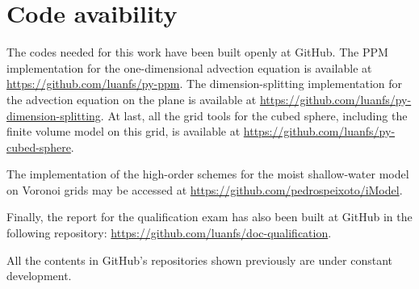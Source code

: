 \chapter{Code avaibility}
\label{anexo-code}

The codes needed for this work have been built openly at GitHub. 
The PPM implementation for the one-dimensional advection equation is available 
at \url{https://github.com/luanfs/py-ppm}.
The dimension-splitting implementation for the advection equation on the plane 
is available at \url{https://github.com/luanfs/py-dimension-splitting}.
At last, all the grid tools for the cubed sphere, including the finite volume
model on this grid, is available at \url{https://github.com/luanfs/py-cubed-sphere}.

The implementation of the high-order schemes for the moist shallow-water model
on Voronoi grids may be accessed at
\url{https://github.com/pedrospeixoto/iModel}.

Finally, the report for the qualification exam has also been built at  GitHub in the following  repository:
\url{https://github.com/luanfs/doc-qualification}.

All the contents in GitHub's repositories shown previously are under constant development.

